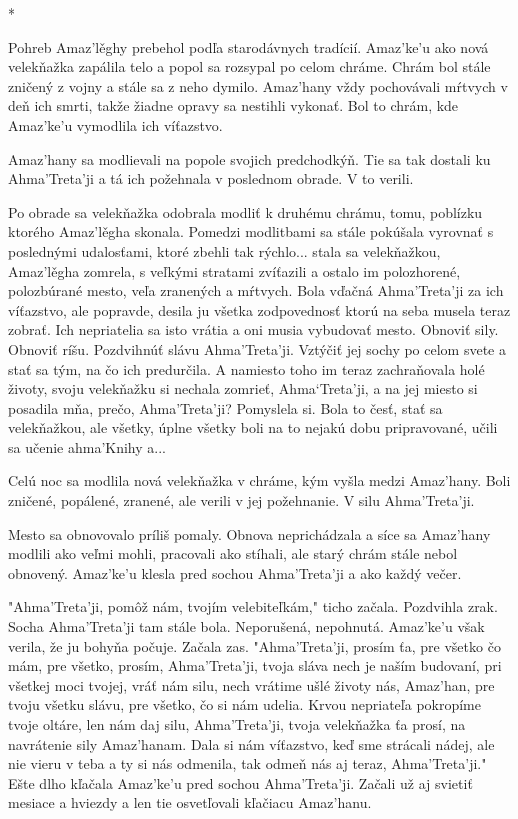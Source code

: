 \documentclass{book}
\begin{document}
\begin{center}
*
\end{center}

Pohreb Amaz'le\v{}ghy prebehol podľa starodávnych tradícií. Amaz'ke'u ako nová velekňažka zapálila telo a popol sa rozsypal po celom chráme. Chrám bol stále zničený z vojny a stále sa z neho dymilo. Amaz'hany vždy pochovávali mŕtvych v deň ich smrti, takže žiadne opravy sa nestihli vykonať. Bol to chrám, kde Amaz'ke'u vymodlila ich víťazstvo.

Amaz'hany sa modlievali na popole svojich predchodkýň. Tie sa tak dostali ku Ahma'Treta'ji a tá ich požehnala v poslednom obrade. V to verili.

Po obrade sa velekňažka odobrala modliť k druhému chrámu, tomu, poblízku ktorého Amaz'le\v{}gha skonala. Pomedzi modlitbami sa stále pokúšala vyrovnať s poslednými udalosťami, ktoré zbehli tak rýchlo... stala sa velekňažkou, Amaz'le\v{}gha zomrela, s veľkými stratami zvíťazili a ostalo im polozhorené, polozbúrané mesto, veľa zranených a mŕtvych. Bola vďačná Ahma'Treta'ji za ich víťazstvo, ale popravde, desila ju všetka zodpovednosť ktorú na seba musela teraz zobrať. Ich nepriatelia sa isto vrátia a oni musia vybudovať mesto. Obnoviť sily. Obnoviť ríšu. Pozdvihnúť slávu Ahma'Treta'ji. Vztýčiť jej sochy po celom svete a stať sa tým, na čo ich predurčila. A namiesto toho im teraz zachraňovala holé životy, svoju velekňažku si nechala zomrieť, Ahma‘Treta'ji, a na jej miesto si posadila mňa, prečo, Ahma'Treta'ji? Pomyslela si. Bola to česť, stať sa velekňažkou, ale všetky, úplne všetky boli na to nejakú dobu pripravované, učili sa učenie ahma'Knihy a...

Celú noc sa modlila nová velekňažka v chráme, kým vyšla medzi Amaz'hany. Boli zničené, popálené, zranené, ale verili v jej požehnanie. V silu Ahma'Treta'ji.

Mesto sa obnovovalo príliš pomaly. Obnova neprichádzala a síce sa Amaz'hany modlili ako veľmi mohli, pracovali ako stíhali, ale starý chrám stále nebol obnovený. Amaz'ke'u klesla pred sochou Ahma'Treta'ji a ako každý večer.

"$ $Ahma'Treta'ji, pomôž nám, tvojím velebiteľkám,"$ $ ticho začala. Pozdvihla zrak. Socha Ahma'Treta'ji tam stále bola. Neporušená, nepohnutá. Amaz'ke'u však verila, že ju bohyňa počuje. Začala zas. "$ $Ahma'Treta'ji, prosím ťa, pre všetko čo mám, pre všetko, prosím, Ahma'Treta'ji, tvoja sláva nech je naším budovaní, pri všetkej moci tvojej, vráť nám silu, nech vrátime ušlé životy nás, Amaz'han, pre tvoju všetku slávu, pre všetko, čo si nám udelia. Krvou nepriateľa pokropíme tvoje oltáre, len nám daj silu, Ahma'Treta'ji, tvoja velekňažka ťa prosí, na navrátenie sily Amaz'hanam. Dala si nám víťazstvo, keď sme strácali nádej, ale nie vieru v teba a ty si nás odmenila, tak odmeň nás aj teraz, Ahma'Treta'ji."$ $ Ešte dlho kľačala Amaz'ke'u pred sochou Ahma'Treta'ji. Začali už aj svietiť mesiace a hviezdy a len tie osvetľovali kľačiacu Amaz'hanu.
\end{document}
